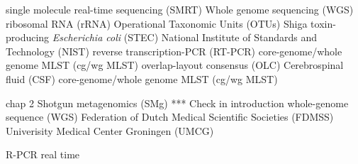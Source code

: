 
\begin{acronym}[MPC] %




\end{acronym}


single molecule real-time sequencing (SMRT)
Whole genome sequencing (WGS)
ribosomal RNA (rRNA)
Operational Taxonomic Units (OTUs)
Shiga toxin-producing \textit{Escherichia coli} (STEC)
National Institute of Standards and Technology (NIST)
reverse transcription-PCR (RT-PCR)
core-genome/whole genome MLST (cg/wg MLST)
overlap-layout consensus (OLC)
Cerebrospinal fluid (CSF)
core-genome/whole genome MLST (cg/wg MLST)

chap 2 
Shotgun metagenomics (SMg) *** Check in introduction
whole-genome sequence (WGS)
Federation of Dutch Medical Scientific Societies (FDMSS)
Univerisity Medical Center Groningen (UMCG)

R-PCR real time 